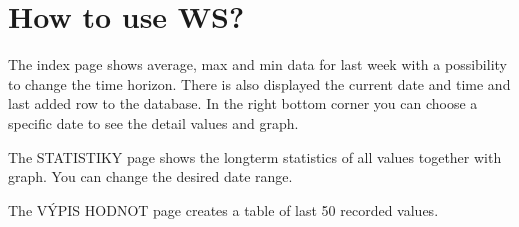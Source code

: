 \section*{How to use WS?}

The index page shows average, max and min data for last week with a possibility to change the time horizon. There is also displayed the current date and time and last added row to the database. In the right bottom corner you can choose a specific date to see the detail values and graph. 

The S\+T\+A\+T\+I\+S\+T\+I\+KY page shows the longterm statistics of all values together with graph. You can change the desired date range. 

The VÝ\+P\+IS H\+O\+D\+N\+OT page creates a table of last 50 recorded values.  